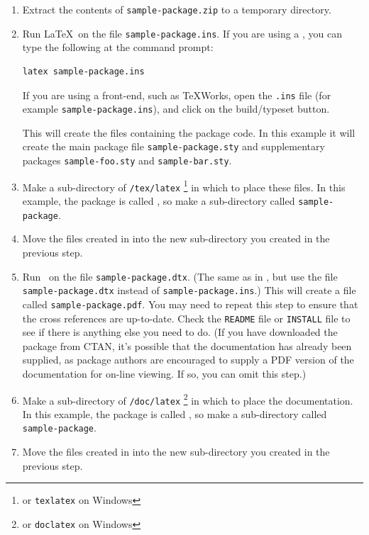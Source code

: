 \begin{enumerate}
\item Extract the contents of \texttt{sample-package.zip} to a
temporary directory.

\item\label{itm:ins} Run \LaTeX\ on the file \texttt{sample-package.ins}. If
you are using a , you can type the
following at the command prompt:
\begin{verbatim}
latex sample-package.ins
\end{verbatim}
If you are using a front-end, such as TeXWorks, open the 
\texttt{.ins} file
(for example \texttt{sample-package.ins}), and click on the build/typeset button.

This will create the files containing the package code. In this
example it will create the main package file \texttt{sample-package.sty}
and supplementary packages \texttt{sample-foo.sty} and \texttt{sample-bar.sty}.

\item Make a sub-directory of \texttt{/tex/latex}%
\footnote{or \texttt{\backslashsym tex\backslashsym latex} on 
Windows} in which to place these files. In this example, the package is
called , so make a sub-directory called \texttt{sample-package}.

\item Move the files created in  into
the new sub-directory you created in the previous step.

\item\label{itm:dtx} Run \iPDFLaTeX\ on the file \texttt{sample-package.dtx}.
(The same as in , but use the file
\texttt{sample-package.dtx} instead of \texttt{sample-package.ins}.) This will 
create a file called \texttt{sample-package.pdf}. You may need to repeat
this step to ensure that the cross references are up-to-date.
Check the \texttt{README} file or \texttt{INSTALL} file to see
if there is anything else you need to do. (If you have downloaded
the package from CTAN, it's possible that the documentation has 
already been supplied, as package authors are encouraged to supply
a PDF version of the documentation for on-line viewing. If so,
you can omit this step.)

\item  Make a sub-directory of \texttt{/doc/latex}%
\footnote{or \texttt{\backslashsym doc\backslashsym latex} on 
Windows} in which to place the documentation. In this example, the package is
called , so make a sub-directory called
\texttt{sample-package}.

\item Move the files created in  into
the new sub-directory you created in the previous step.

\end{enumerate}

